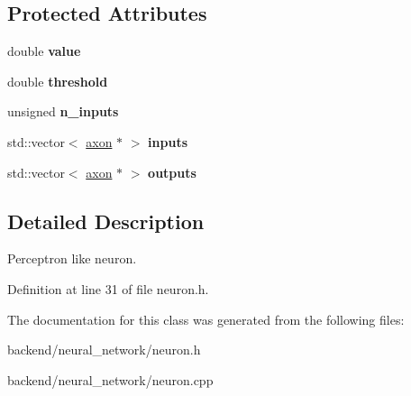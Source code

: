 \subsection*{Protected Attributes}
\begin{DoxyCompactItemize}
\item 
\mbox{\label{classneuron_a991ef728f717c5421dc1c7eeb239f9a7}} 
double {\bfseries value}
\item 
\mbox{\label{classneuron_ac730fc8c9d0c6f4d0a26ac9008c5b079}} 
double {\bfseries threshold}
\item 
\mbox{\label{classneuron_afa18eb496b92d6f3492c585a52562b8a}} 
unsigned {\bfseries n\+\_\+inputs}
\item 
\mbox{\label{classneuron_afe6dd27464dcc663c48abfe98b4c3611}} 
std\+::vector$<$ \mbox{\hyperlink{classaxon}{axon}} $\ast$ $>$ {\bfseries inputs}
\item 
\mbox{\label{classneuron_aca8ecff762063d557618a34d7f886390}} 
std\+::vector$<$ \mbox{\hyperlink{classaxon}{axon}} $\ast$ $>$ {\bfseries outputs}
\end{DoxyCompactItemize}


\subsection{Detailed Description}
Perceptron like neuron. 

Definition at line 31 of file neuron.\+h.



The documentation for this class was generated from the following files\+:\begin{DoxyCompactItemize}
\item 
backend/neural\+\_\+network/neuron.\+h\item 
backend/neural\+\_\+network/neuron.\+cpp\end{DoxyCompactItemize}
